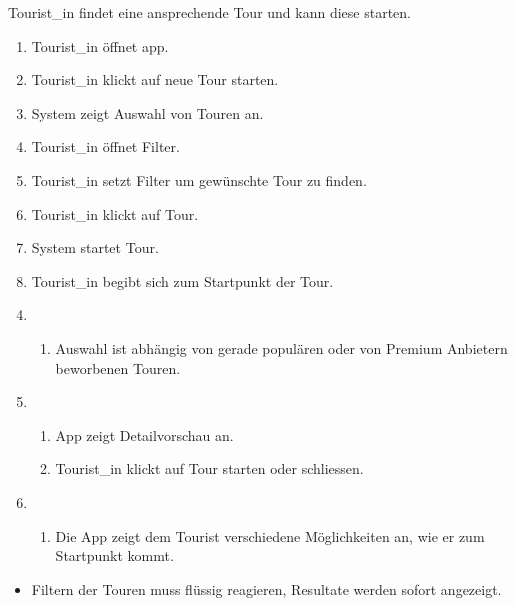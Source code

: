 \label{erfolgsgarantie}
Tourist\_in findet eine ansprechende Tour und kann diese starten.


\label{standardablauf}
\begin{enumerate}
  \item Tourist\_in öffnet app.
  \item Tourist\_in klickt auf neue Tour starten.
  \item System zeigt Auswahl von Touren an.
  \item Tourist\_in öffnet Filter.
  \item Tourist\_in setzt Filter um gewünschte Tour zu finden.
  \item Tourist\_in klickt auf Tour.
  \item System startet Tour.
  \item Tourist\_in begibt sich zum Startpunkt der Tour.
\end{enumerate}


\label{erweiterungen}
\begin{enumerate}
  \setcounter{enumi}{3}
  \item
    \begin{enumerate}
      \item Auswahl ist abhängig von gerade populären oder von Premium Anbietern beworbenen Touren.
    \end{enumerate}

  \setcounter{enumi}{6}
  \item
    \begin{enumerate}
      \item App zeigt Detailvorschau an.
      \item Tourist\_in klickt auf Tour starten oder schliessen.
    \end{enumerate}

  \setcounter{enumi}{8}
  \item
    \begin{enumerate}
      \item Die App zeigt dem Tourist verschiedene Möglichkeiten an, wie er zum Startpunkt kommt.
    \end{enumerate}
\end{enumerate}


\label{spezielle-anforderungen}
\begin{itemize}
  \item Filtern der Touren muss flüssig reagieren, Resultate werden sofort angezeigt.
\end{itemize}


